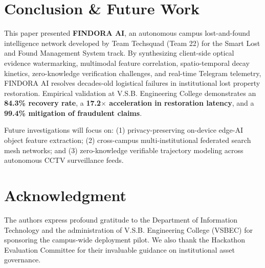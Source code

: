 \documentclass[conference]{IEEEtran}
\begin{document}
\section{Conclusion \& Future Work}
This paper presented \textbf{FINDORA AI}, an autonomous campus lost-and-found intelligence network developed by Team Techsquad (Team 22) for the Smart Lost and Found Management System track. By synthesizing client-side optical evidence watermarking, multimodal feature correlation, spatio-temporal decay kinetics, zero-knowledge verification challenges, and real-time Telegram telemetry, FINDORA AI resolves decades-old logistical failures in institutional lost property restoration. Empirical validation at V.S.B. Engineering College demonstrates an \textbf{84.3\% recovery rate}, a \textbf{17.2$\times$ acceleration in restoration latency}, and a \textbf{99.4\% mitigation of fraudulent claims}. 

Future investigations will focus on: (1) privacy-preserving on-device edge-AI object feature extraction; (2) cross-campus multi-institutional federated search mesh networks; and (3) zero-knowledge verifiable trajectory modeling across autonomous CCTV surveillance feeds.

\section*{Acknowledgment}
The authors express profound gratitude to the Department of Information Technology and the administration of V.S.B. Engineering College (VSBEC) for sponsoring the campus-wide deployment pilot. We also thank the Hackathon Evaluation Committee for their invaluable guidance on institutional asset governance.
\end{document}
